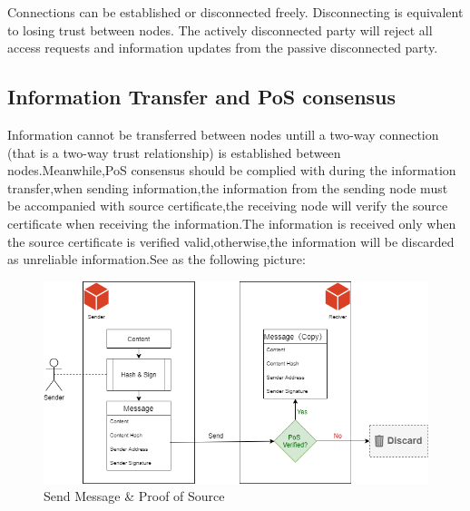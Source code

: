 \documentclass{article}
\begin{document}
    Connections can be established or  disconnected freely. Disconnecting is equivalent to losing trust between nodes. The actively disconnected party will reject all access requests and information updates from the passive disconnected party.
\subsection{Information Transfer and PoS consensus}\label{msg_and_pos}
    Information cannot be transferred between nodes untill a two-way connection (that is a two-way trust relationship) is established between nodes.Meanwhile,PoS consensus should be complied with during the information transfer,when sending information,the information from the sending node must be accompanied with source certificate,the receiving node will verify the source certificate when receiving the information.The information is received only when the source certificate is verified valid,otherwise,the information will be discarded as unreliable information.See as the following picture: 

    \begin{figure}[H]
        \centering
        \includegraphics[width=\textwidth]{figures-pos.png}
        \caption{Send Message \& Proof of Source}
    \end{figure}
\end{document}
